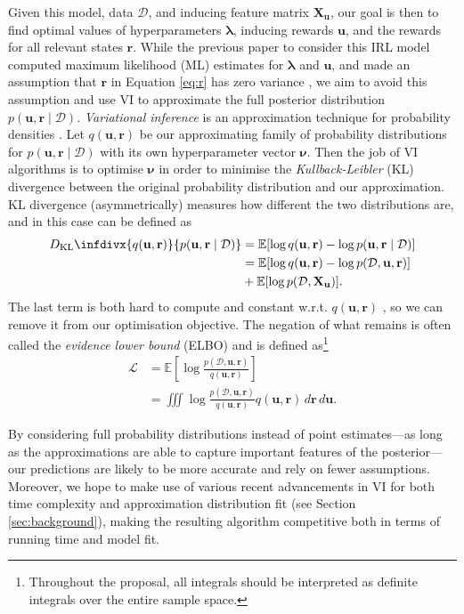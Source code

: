 \documentclass{mpaper}
\newcommand{\DKL}{D_{\mathrm{KL}}\infdivx}
\newcommand{\dx}{\,d\mathbf{r}\,d\mathbf{u}}
\newcommand{\pfull}{p(\mathcal{D}, \mathbf{u}, \mathbf{r})}
\newcommand{\approximation}{q(\mathbf{u}, \mathbf{r})}
\newcommand{\posterior}{p(\mathbf{u}, \mathbf{r} \mid \mathcal{D})}
\begin{document}
Given this model, data $\mathcal{D}$, and inducing feature matrix
$\mathbf{X_u}$, our goal is then to find optimal values of hyperparameters
$\bm\lambda$, inducing rewards $\mathbf{u}$, and the rewards for all relevant
states $\mathbf{r}$. While the previous paper to consider this IRL model
computed maximum likelihood (ML) estimates for $\bm\lambda$ and $\mathbf{u}$,
and made an assumption that $\mathbf{r}$ in Equation \ref{eq:r} has zero variance
\cite{DBLP:conf/nips/LevinePK11}, we aim to avoid this assumption and use
VI to approximate the full posterior distribution $\posterior$.
\emph{Variational inference} is an approximation technique for probability
densities \cite{blei2017variational}. Let $\approximation$ be our approximating
family of probability distributions for $\posterior$ with its own hyperparameter
vector $\bm\nu$. Then the job of VI algorithms is to optimise $\bm\nu$ in order
to minimise the \emph{Kullback-Leibler} (KL) divergence between the original
probability distribution and our approximation.  KL divergence (asymmetrically)
measures how different the two distributions are, and in this case can be
defined as \cite{blei2017variational}
\begin{align*}
  \DKL{\approximation}{\posterior} &= \mathbb{E}[\log\approximation - \log\posterior ] \\
                                   &= \mathbb{E}[\log\approximation - \log\pfull] \\
                                   &+ \mathbb{E}[\log p(\mathcal{D}, \mathbf{X_u})].
\end{align*}
The last term is both hard to compute and constant w.r.t. $\approximation$
\cite{blei2017variational}, so we can remove it from our optimisation objective.
The negation of what remains is often called the \emph{evidence lower bound}
(ELBO) and is defined as\footnote{Throughout the proposal, all integrals should
  be interpreted as definite integrals over the entire sample space.}
\cite{DBLP:books/lib/Bishop07,blei2017variational}
\begin{equation} \label{eq:elbo}
  \begin{split}
    \mathcal{L} &= \mathbb{E}\left[ \log \frac{\pfull}{\approximation} \right] \\
    &= \iiint \log \frac{\pfull}{\approximation} \approximation\dx.
  \end{split}
\end{equation}

By considering full probability distributions instead of point estimates---as
long as the approximations are able to capture important features of the
posterior---our predictions are likely to be more accurate and rely on fewer
assumptions. Moreover, we hope to make use of various recent advancements in VI
for both time complexity and approximation distribution fit (see Section
\ref{sec:background}), making the resulting algorithm competitive both in terms of
running time and model fit.
\end{document}
